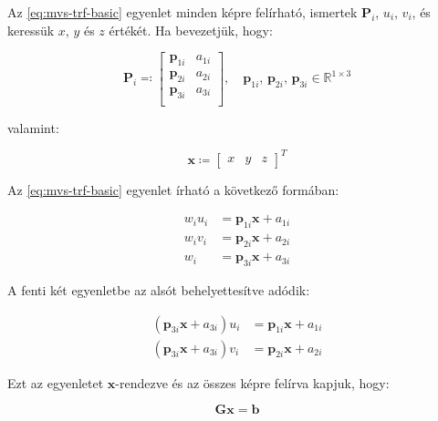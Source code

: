 	Az \eqref{eq:mvs-trf-basic} egyenlet minden képre felírható, ismertek $\mathbf{P}_i$, $u_i$, $v_i$, és keressük $x$, $y$ és $z$ értékét. Ha bevezetjük, hogy:
	
	\begin{equation}
	\mathbf{P}_i \eqqcolon \left[ \begin{array}{cc} 
	\mathbf{p}_{1i} & a_{1i} \\
	\mathbf{p}_{2i} & a_{2i} \\
	\mathbf{p}_{3i} & a_{3i} \\
	 \end{array} \right], \quad 
	 \mathbf{p}_{1i}, \,
	 \mathbf{p}_{2i}, \, 
	 \mathbf{p}_{3i} \in \mathbb{R}^{1 \times 3}
	\end{equation}
	
	valamint:
	
	\begin{equation}
	\mathbf{x} \coloneqq \left[ \begin{array}{ccc} x & y & z \end{array} \right]^T
	\end{equation}
	
	Az \eqref{eq:mvs-trf-basic} egyenlet írható a következő formában:
	
	\begin{equation}
	\begin{split}
	w_i u_i &= \mathbf{p}_{1i}\mathbf{x} + a_{1i} \\
	w_i v_i &= \mathbf{p}_{2i}\mathbf{x} + a_{2i} \\
	w_i &= \mathbf{p}_{3i}\mathbf{x} + a_{3i}
	\end{split}
	\end{equation}
	
	A fenti két egyenletbe az alsót behelyettesítve adódik:
	
	\begin{equation}
	\begin{split}
	\left(\mathbf{p}_{3i}\mathbf{x} + a_{3i}\right)u_i &= \mathbf{p}_{1i}\mathbf{x} + a_{1i} \\
	\left(\mathbf{p}_{3i}\mathbf{x} + a_{3i}\right)v_i &= \mathbf{p}_{2i}\mathbf{x} + a_{2i}
	\end{split}
	\end{equation}
	
	Ezt az egyenletet $\mathbf{x}$-rendezve és az összes képre felírva kapjuk, hogy:
	
	\begin{equation}
	\mathbf{G}\mathbf{x}=\mathbf{b}
	\end{equation}
	

